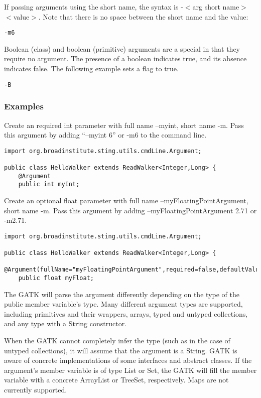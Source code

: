 \documentclass[11pt,fullpage]{article}
\begin{document}
If passing arguments using the short name,
the syntax is -$<$arg short name$>$$<$value$>$.  Note that there is no space
between the short name and the value:
\begin{verbatim}
-m6
\end{verbatim}

Boolean (class) and boolean (primitive) arguments are a special in
that they require no argument.  The presence of a boolean indicates
true, and its absence indicates false.  The following example sets a
flag to true.
\begin{verbatim}
-B

\end{verbatim}

\subsubsection{Examples}

Create an required int parameter with full name --myint, short name
-m.
Pass this argument by adding ``--myint 6'' or -m6 to the command line.
\begin{verbatim}
import org.broadinstitute.sting.utils.cmdLine.Argument;

public class HelloWalker extends ReadWalker<Integer,Long> {
    @Argument
    public int myInt;
\end{verbatim}

Create an optional float parameter with full name
--myFloatingPointArgument, short name -m.  Pass this argument by
adding --myFloatingPointArgument 2.71 or -m2.71.
\begin{verbatim}
import org.broadinstitute.sting.utils.cmdLine.Argument;

public class HelloWalker extends ReadWalker<Integer,Long> {
    @Argument(fullName="myFloatingPointArgument",required=false,defaultValue="3.14159")
    public float myFloat;
\end{verbatim}

The GATK will parse the argument differently depending on the type of
the public member variable's type.  Many different argument types are 
supported, including primitives and their wrappers, arrays, typed and 
untyped collections, and any type with a String constructor.

When the GATK cannot completely infer the type (such as in the case of
untyped collections), it will assume that the argument is a String.
GATK is aware of concrete implementations of some interfaces and
abstract classes.  If the argument's member variable is of type List
or Set, the GATK will fill the member variable with a concrete
ArrayList or TreeSet, respectively.  Maps are not currently supported.
\end{document}

